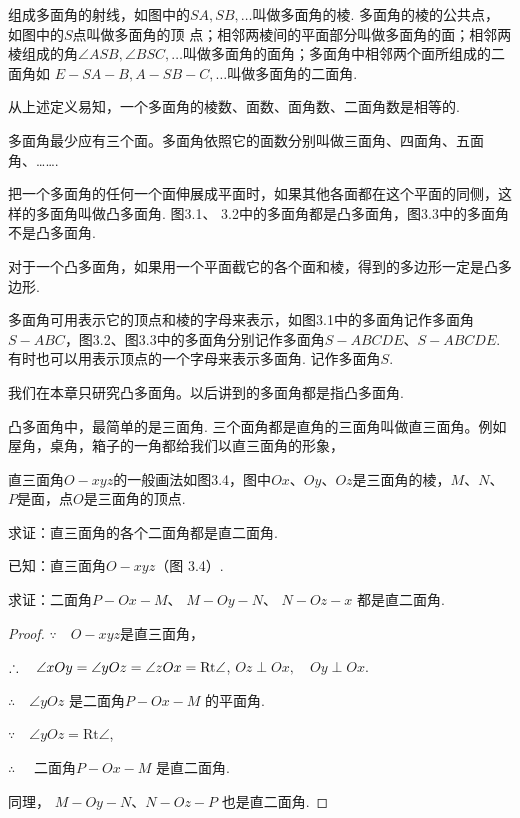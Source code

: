 组成多面角的射线，如图中的$SA, SB,\ldots$叫做多面角的棱. 多面角的棱的公共点，如图中的$S$点叫做多面角的顶
点；相邻两棱间的平面部分叫做多面角的面；相邻两棱组成的角$\angle ASB,  \angle BSC,\ldots$叫做多面角的面角；多面角中相邻两个面所组成的二面角如 $E-SA-B,  A-SB-C,\ldots$叫做多面角的二面角.

从上述定义易知，一个多面角的棱数、面数、面角数、二面角数是相等的.

多面角最少应有三个面。多面角依照它的面数分别叫做三面角、四面角、五面角、…….

把一个多面角的任何一个面伸展成平面时，如果其他各面都在这个平面的同侧，这样的多面角叫做凸多面角. 图3.1、 3.2中的多面角都是凸多面角，图3.3中的多面角不是凸多面角.

对于一个凸多面角，如果用一个平面截它的各个面和棱，得到的多边形一定是凸多边形.

多面角可用表示它的顶点和棱的字母来表示，如图3.1中的多面角记作多面角$S-ABC$，图3.2、图3.3中的多面角分别记作多面角$S-ABCDE$、$S-ABCDE$. 有时也可以用表示顶点的一个字母来表示多面角. 记作多面角$S$.

我们在本章只研究凸多面角。以后讲到的多面角都是指凸多面角.

凸多面角中，最简单的是三面角. 三个面角都是直角的三面角叫做直三面角。例如屋角，桌角，箱子的一角都给我们以直三面角的形象，

直三面角$O-xyz$的一般画法如图3.4，图中$Ox$、$Oy$、$Oz$是三面角的棱，$M$、$N$、$P$是面，点$O$是三面角的顶点.

\begin{example}
    求证：直三面角的各个二面角都是直二面角.

已知：直三面角$O-xyz$（图 3.4）.

求证：二面角$P-Ox-M$、  $M-Oy-N$、  $N-Oz-x$ 都是直二面角.
\begin{figure}[htp]
    \centering
{}
    \caption{}
\end{figure}
\end{example}

\begin{proof}
$\because \quad O-xyz$是直三面角，

$\therefore\quad \angle xOy=\angle yOz
=\angle zOx={\rm Rt}\angle$,
$Oz\perp Ox,\quad Oy\perp Ox$.

$\therefore\quad  \angle yOz$ 是二面角$P-Ox-M$ 的平面角.

$\because\quad \angle yOz=\mathrm{Rt}\angle$, 

$\therefore\quad$ 二面角$P-Ox-M$ 是直二面角.

同理， $M-Oy-N$、$N-Oz-P$ 也是直二面角.
\end{proof}

